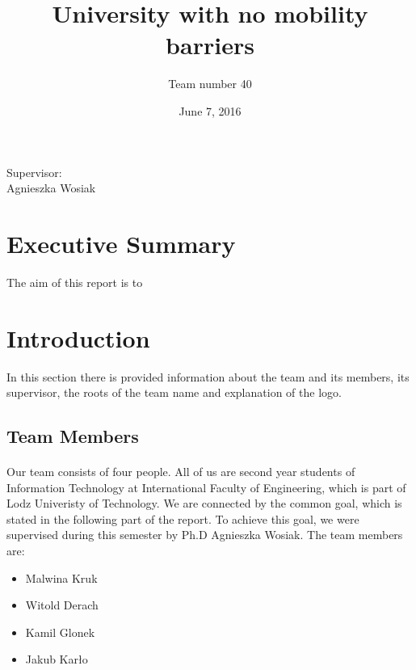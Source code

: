 \documentclass[12pt]{article}
\begin{document}
\begin{titlepage}
\title{University with no mobility barriers}
\date {June 7, 2016}
\author{Team number 40}
\maketitle
{}
\vfill
\raggedright
Supervisor: \\ Agnieszka Wosiak
\end{titlepage}


\section*{Executive Summary}
The aim of this report is to
\cleardoublepage

\tableofcontents
\thispagestyle{empty}

\newpage

\setcounter{page}{2}
\section{Introduction}
In this section there is provided information about the team and its members, its supervisor, the roots of the team name and explanation of the logo.
\subsection{Team Members}
\paragraph{} Our team consists of four people. All of us are second year students of Information Technology at International Faculty of Engineering, which is part of Lodz Univeristy of Technology.
We are connected by the common goal, which is stated in the following part of the report. To achieve this goal, we were supervised during this semester by Ph.D Agnieszka Wosiak. The team members are:
\begin{itemize}
\item Malwina Kruk
\item Witold Derach
\item Kamil Glonek
\item Jakub Kar\l{}o
\end{itemize}
\end{document}

